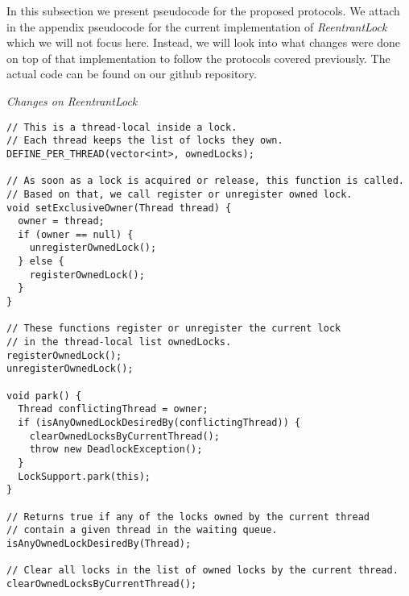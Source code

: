 In this subsection we present pseudocode for the proposed protocols. We attach in the appendix pseudocode for the current implementation of \emph{ReentrantLock} which we will not focus here. Instead, we will look into what changes were done on top of that implementation to follow the protocols covered previously. The actual code can be found on our github repository.


\noindent
{\it Changes on ReentrantLock}
\begin{verbatim}
// This is a thread-local inside a lock.
// Each thread keeps the list of locks they own.
DEFINE_PER_THREAD(vector<int>, ownedLocks);

// As soon as a lock is acquired or release, this function is called.
// Based on that, we call register or unregister owned lock.
void setExclusiveOwner(Thread thread) {
  owner = thread;
  if (owner == null) {
    unregisterOwnedLock();
  } else {
    registerOwnedLock();
  }
}

// These functions register or unregister the current lock
// in the thread-local list ownedLocks.
registerOwnedLock();
unregisterOwnedLock();

void park() {
  Thread conflictingThread = owner;
  if (isAnyOwnedLockDesiredBy(conflictingThread)) {
    clearOwnedLocksByCurrentThread();
    throw new DeadlockException();
  }
  LockSupport.park(this);
}

// Returns true if any of the locks owned by the current thread
// contain a given thread in the waiting queue.
isAnyOwnedLockDesiredBy(Thread);

// Clear all locks in the list of owned locks by the current thread.
clearOwnedLocksByCurrentThread();
\end{verbatim}





